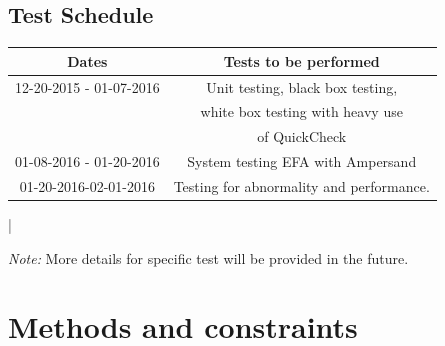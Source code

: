 \documentclass[12pt]{report}
\begin{document}
\section{Test Schedule}\label{sec:TestSched}
\begin{center}
 	\begin{tabular}{| c | c| } \hline
 		Dates & Tests to be performed \\ \hline
 		12-20-2015 - 01-07-2016 & Unit testing, black box testing, \\ & white 
 		box 
 		testing with heavy use \\ & of QuickCheck  \\ \hline
 		01-08-2016 - 01-20-2016 & System testing EFA with Ampersand  \\  \hline
 	 01-20-2016-02-01-2016     & Testing for abnormality and performance. \\ 
 	 \hline     
 	\end{tabular}
 \end{center}|

 \emph{Note:} More details for specific test will be provided in the future.
\chapter{Methods and constraints}\label{ch:Methods}
\end{document}
